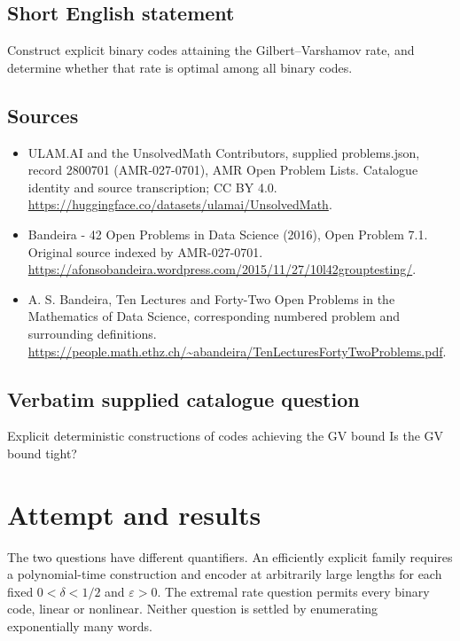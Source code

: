 \documentclass[11pt]{article}
\begin{document}
\subsection{Short English statement}
Construct explicit binary codes attaining the Gilbert–Varshamov rate, and determine whether that rate is optimal among all binary codes.
\subsection{Sources}
\begin{itemize}
\item[S1] ULAM.AI and the UnsolvedMath Contributors, supplied problems.json, record 2800701 (AMR-027-0701), AMR Open Problem Lists. Catalogue identity and source transcription; CC BY 4.0.
\url{https://huggingface.co/datasets/ulamai/UnsolvedMath}.
\item[S2] Bandeira - 42 Open Problems in Data Science (2016), Open Problem 7.1. Original source indexed by AMR-027-0701.
\url{https://afonsobandeira.wordpress.com/2015/11/27/10l42grouptesting/}.
\item[S3] A. S. Bandeira, Ten Lectures and Forty-Two Open Problems in the Mathematics of Data Science, corresponding numbered problem and surrounding definitions.
\url{https://people.math.ethz.ch/~abandeira/TenLecturesFortyTwoProblems.pdf}.
\end{itemize}
\subsection{Verbatim supplied catalogue question}
Explicit deterministic constructions of codes achieving the GV bound Is the GV bound tight?

\section{Attempt and results}
The two questions have different quantifiers. An efficiently explicit family
requires a polynomial-time construction and encoder at arbitrarily large
lengths for each fixed $0<\delta<1/2$ and $\varepsilon>0$.
The extremal rate question permits every binary code, linear or nonlinear.
Neither question is settled by enumerating exponentially many words.
\end{document}

